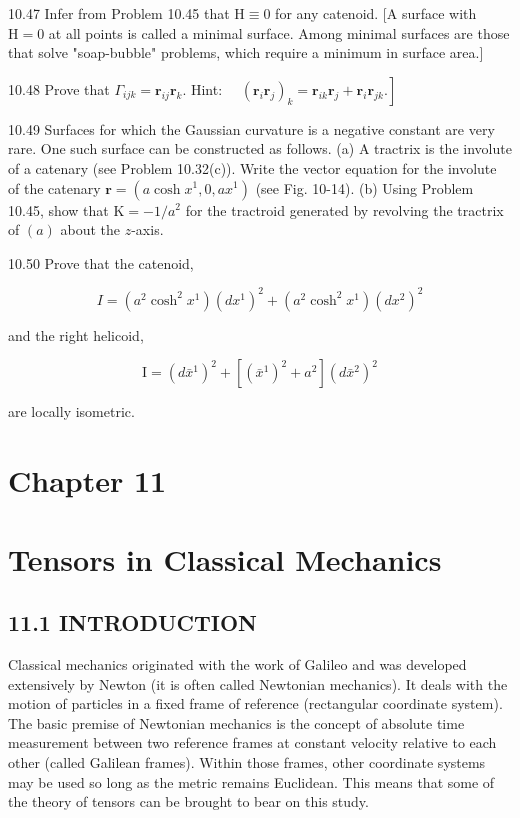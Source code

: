 \documentclass[10pt]{article}
\begin{document}
10.47 Infer from Problem 10.45 that $\mathrm{H} \equiv 0$ for any catenoid. [A surface with $\mathrm{H}=0$ at all points is called a minimal surface. Among minimal surfaces are those that solve "soap-bubble" problems, which require a minimum in surface area.]

10.48 Prove that $\Gamma_{i j k}=\mathbf{r}_{i j} \mathbf{r}_{k}$. Hint: $\left.\quad\left(\mathbf{r}_{i} \mathbf{r}_{j}\right)_{k}=\mathbf{r}_{i k} \mathbf{r}_{j}+\mathbf{r}_{i} \mathbf{r}_{j k}.\right]$

10.49 Surfaces for which the Gaussian curvature is a negative constant are very rare. One such surface can be constructed as follows. (a) A tractrix is the involute of a catenary (see Problem 10.32(c)). Write the vector equation for the involute of the catenary $\mathbf{r}=\left(a \cosh x^{1}, 0, a x^{1}\right)$ (see Fig. 10-14). (b) Using Problem 10.45, show that $\mathrm{K}=-1 / a^{2}$ for the tractroid generated by revolving the tractrix of $(a)$ about the $z$-axis.

10.50 Prove that the catenoid,

$$
I=\left(a^{2} \cosh ^{2} x^{1}\right)\left(d x^{1}\right)^{2}+\left(a^{2} \cosh ^{2} x^{1}\right)\left(d x^{2}\right)^{2}
$$

and the right helicoid,

$$
\mathrm{I}=\left(d \bar{x}^{1}\right)^{2}+\left[\left(\bar{x}^{1}\right)^{2}+a^{2}\right]\left(d \bar{x}^{2}\right)^{2}
$$

are locally isometric.

\section*{Chapter 11}
\section*{Tensors in Classical Mechanics}
\subsection*{11.1 INTRODUCTION}
Classical mechanics originated with the work of Galileo and was developed extensively by Newton (it is often called Newtonian mechanics). It deals with the motion of particles in a fixed frame of reference (rectangular coordinate system). The basic premise of Newtonian mechanics is the concept of absolute time measurement between two reference frames at constant velocity relative to each other (called Galilean frames). Within those frames, other coordinate systems may be used so long as the metric remains Euclidean. This means that some of the theory of tensors can be brought to bear on this study.
\end{document}
